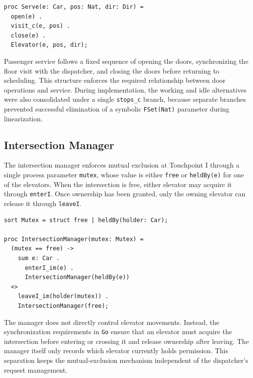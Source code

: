 \begin{lstlisting}
proc Serve(e: Car, pos: Nat, dir: Dir) =
  open(e) .
  visit_c(e, pos) .
  close(e) .
  Elevator(e, pos, dir);
\end{lstlisting}

Passenger service follows a fixed sequence of opening the doors, synchronizing the floor visit with the dispatcher, and closing the doors before returning to scheduling. This structure enforces the required relationship between door operations and service. During implementation, the working and idle alternatives were also consolidated under a single \texttt{stops\_c} branch, because separate branches prevented successful elimination of a symbolic \texttt{FSet(Nat)} parameter during linearization.

\subsection{Intersection Manager}
\label{subsec:intersection-manager}

The intersection manager enforces mutual exclusion at Touchpoint I through a single process parameter \texttt{mutex}, whose value is either \texttt{free} or \texttt{heldBy(e)} for one of the elevators. When the intersection is free, either elevator may acquire it through \texttt{enterI}. Once ownership has been granted, only the owning elevator can release it through \texttt{leaveI}.

\begin{lstlisting}
sort Mutex = struct free | heldBy(holder: Car);

proc IntersectionManager(mutex: Mutex) =
  (mutex == free) ->
    sum e: Car .
      enterI_im(e) .
      IntersectionManager(heldBy(e))
  <>
    leaveI_im(holder(mutex)) .
    IntersectionManager(free);
\end{lstlisting}

The manager does not directly control elevator movements. Instead, the synchronization requirements in \texttt{Go} ensure that an elevator must acquire the intersection before entering or crossing it and release ownership after leaving. The manager itself only records which elevator currently holds permission. This separation keeps the mutual-exclusion mechanism independent of the dispatcher's request management.

